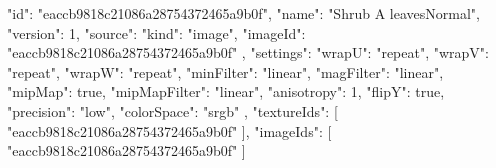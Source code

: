 {
  "id": "eaccb9818c21086a28754372465a9b0f",
  "name": "Shrub A leavesNormal",
  "version": 1,
  "source": {
    "kind": "image",
    "imageId": "eaccb9818c21086a28754372465a9b0f"
  },
  "settings": {
    "wrapU": "repeat",
    "wrapV": "repeat",
    "wrapW": "repeat",
    "minFilter": "linear",
    "magFilter": "linear",
    "mipMap": true,
    "mipMapFilter": "linear",
    "anisotropy": 1,
    "flipY": true,
    "precision": "low",
    "colorSpace": "srgb"
  },
  "textureIds": [
    "eaccb9818c21086a28754372465a9b0f"
  ],
  "imageIds": [
    "eaccb9818c21086a28754372465a9b0f"
  ]
}
